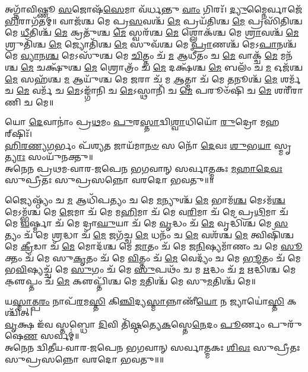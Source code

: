 {\small \closesection}

\newcommand{\cham}[3]{\refstepcounter{cj}%
#1\\
𑌅𑌨𑍇𑌨 #2-𑌵𑌾𑌰-𑌜𑌪𑍇𑌨 𑌭𑌗𑌵𑌾𑌨𑍍 𑌸𑌰𑍍𑌵𑌾𑌤𑍍𑌮𑌕𑌃 \underline{#3} 𑌸𑍁𑌪𑍍𑌰𑍀𑌤𑌃 𑌸𑍁𑌪𑍍𑌰𑌸𑌨𑍍𑌨𑍋 𑌵𑌰𑌦𑍋 𑌭𑌵𑌤𑍁॥\devanumber{\arabic{cj}}॥}

𑌅𑌗𑍍𑌨𑌾᳴𑌵𑌿𑌷𑍍𑌣𑍂 \ul{𑌸}\-𑌜𑍋𑌷᳴\-\ul{𑌸𑍇}\-𑌮𑌾 𑌵᳴𑌰𑍍𑌧𑌨𑍍𑌤𑍁 \ul{𑌵𑌾𑌂} 𑌗𑌿𑌰𑌃᳴। \ul{𑌦𑍍𑌯𑍁}\-𑌮𑍍𑌨𑍈𑌰𑍍𑌵𑌾𑌜𑍇᳴\-\ul{𑌭𑌿}\-𑌰𑌾\-𑌗᳴𑌤𑌮𑍍॥ 
𑌵𑌾𑌜᳴𑌶𑍍𑌚 𑌮𑍇 𑌪𑍍𑌰\-\ul{𑌸}\-𑌵𑌶𑍍𑌚᳴ \ul{𑌮𑍇} 𑌪𑍍𑌰𑌯᳴𑌤𑌿𑌶𑍍𑌚 \ul{𑌮𑍇} 𑌪𑍍𑌰𑌸𑌿᳴𑌤𑌿𑌶𑍍𑌚 𑌮𑍇 \ul{𑌧𑍀}\-𑌤𑌿𑌶𑍍𑌚᳴ \ul{𑌮𑍇} 𑌕𑍍𑌰𑌤𑍁᳴𑌶𑍍𑌚 \ul{𑌮𑍇} 𑌸𑍍𑌵𑌰᳴𑌶𑍍𑌚 \ul{𑌮𑍇} 𑌶𑍍𑌲𑍋𑌕᳴𑌶𑍍𑌚 𑌮𑍇 \ul{𑌶𑍍𑌰𑌾}\-𑌵𑌶𑍍𑌚᳴ \ul{𑌮𑍇} 𑌶𑍍𑌰𑍁𑌤𑌿᳴𑌶𑍍𑌚 \ul{𑌮𑍇} 𑌜𑍍𑌯𑍋𑌤𑌿᳴𑌶𑍍𑌚 \ul{𑌮𑍇} 𑌸𑍁𑌵᳴𑌶𑍍𑌚 𑌮𑍇 \ul{𑌪𑍍𑌰𑌾}\-𑌣𑌶𑍍𑌚᳴ 𑌮𑍇𑌽\-\ul{𑌪𑌾}\-𑌨𑌶𑍍𑌚᳴ 𑌮𑍇 \ul{𑌵𑍍𑌯𑌾}\-𑌨\-\ul{𑌶𑍍𑌚} 𑌮𑍇𑌽𑌸𑍁᳴𑌶𑍍𑌚 𑌮𑍇 \ul{𑌚𑌿}\-𑌤𑍍𑌤𑌂 𑌚᳴ \ul{𑌮} 𑌆𑌧𑍀᳴𑌤𑌂 𑌚 \ul{𑌮𑍇} 𑌵𑌾𑌕𑍍𑌚᳴ \ul{𑌮𑍇} 𑌮𑌨᳴𑌶𑍍𑌚 \ul{𑌮𑍇} 𑌚𑌕𑍍𑌷𑍁᳴𑌶𑍍𑌚 \ul{𑌮𑍇} 𑌶𑍍𑌰𑍋𑌤𑍍𑌰𑌂᳴ 𑌚 \ul{𑌮𑍇} 𑌦𑌕𑍍𑌷᳴𑌶𑍍𑌚 \ul{𑌮𑍇} 𑌬𑌲𑌂᳴ 𑌚 \ul{𑌮} 𑌓𑌜᳴𑌶𑍍𑌚 \ul{𑌮𑍇} 𑌸𑌹᳴𑌶𑍍𑌚 \ul{𑌮} 𑌆𑌯𑍁᳴𑌶𑍍𑌚 𑌮𑍇 \ul{𑌜}\-𑌰𑌾 𑌚᳴ 𑌮 \ul{𑌆}\-𑌤𑍍𑌮𑌾 𑌚᳴ 𑌮𑍇 \ul{𑌤}\-𑌨𑍂𑌶𑍍𑌚᳴ \ul{𑌮𑍇} 𑌶𑌰𑍍𑌮᳴ 𑌚 \ul{𑌮𑍇} 𑌵𑌰𑍍𑌮᳴ 𑌚 \ul{𑌮𑍇}\-𑌽𑌙𑍍𑌗𑌾᳴𑌨𑌿 𑌚 \ul{𑌮𑍇}\-𑌽𑌸𑍍𑌥𑌾𑌨𑌿᳴ 𑌚 \ul{𑌮𑍇} 𑌪𑌰𑍂𑍞᳴𑌷𑌿 𑌚 \ul{𑌮𑍇} 𑌶𑌰𑍀᳴𑌰𑌾𑌣𑌿 𑌚 𑌮𑍇॥

\cham{𑌯𑍋 \ul{𑌦𑍇}\-𑌵𑌾𑌨𑌾𑌂॑ 𑌪𑍍𑌰\-\ul{𑌥}\-𑌮𑌂 \ul{𑌪𑍁}\-𑌰\-\ul{𑌸𑍍𑌤𑌾}\-𑌦𑍍𑌵𑌿\-\ul{𑌶𑍍𑌵𑌾}\-𑌧𑌿𑌯𑍋᳴ \ul{𑌰𑍁}\-𑌦𑍍𑌰𑍋 𑌮𑌹𑌰𑍍‌𑌷𑌿𑌃᳴।\\
\-\ul{𑌹𑌿}\-\-\ul{𑌰}\-\-\ul{𑌣𑍍𑌯}\-\-\ul{𑌗}\-𑌰𑍍𑌭𑌂 𑌪᳴𑌶𑍍𑌯\-\ul{𑌤} 𑌜𑌾𑌯᳴𑌮𑌾\-\ul{𑌨}\-\-\ul{𑍞} 𑌸 𑌨𑍋᳴ \ul{𑌦𑍇}\-𑌵𑌃 \ul{𑌶𑍁}\-𑌭\-\ul{𑌯𑌾} 𑌸𑍍𑌮𑍃\-\ul{𑌤𑍍𑌯𑌾𑌃} 𑌸𑌂𑌯𑍁᳴𑌨𑌕𑍍𑌤𑍁॥}{𑌪𑍍𑌰𑌥𑌮}{𑌮𑌹𑌾𑌦𑍇𑌵𑌃}

𑌜𑍍𑌯𑍈𑌷𑍍𑌠𑍍𑌯𑌂᳴ 𑌚 \ul{𑌮} 𑌆𑌧𑌿᳴𑌪𑌤𑍍𑌯𑌂 𑌚 𑌮𑍇 \ul{𑌮}\-𑌨𑍍𑌯𑍁𑌶𑍍𑌚᳴ \ul{𑌮𑍇} 𑌭𑌾𑌮᳴\-\ul{𑌶𑍍𑌚} 𑌮𑍇𑌽𑌮᳴\-\ul{𑌶𑍍𑌚} 𑌮𑍇𑌽𑌮𑍍𑌭᳴𑌶𑍍𑌚 𑌮𑍇 \ul{𑌜𑍇}\-𑌮𑌾 𑌚᳴ 𑌮𑍇 𑌮\-\ul{𑌹𑌿}\-𑌮𑌾 𑌚᳴ 𑌮𑍇 𑌵\-\ul{𑌰𑌿}\-𑌮𑌾 𑌚᳴ 𑌮𑍇 𑌪𑍍𑌰\-\ul{𑌥𑌿}\-𑌮𑌾 𑌚᳴ 𑌮𑍇 \ul{𑌵}\-𑌰𑍍𑌷𑍍𑌮𑌾 𑌚᳴ 𑌮𑍇 𑌦𑍍𑌰𑌾\-\ul{𑌘𑍁}\-𑌯𑌾 𑌚᳴ 𑌮𑍇 \ul{𑌵𑍃}\-𑌦𑍍𑌧𑌂 𑌚᳴ \ul{𑌮𑍇} 𑌵𑍃𑌦𑍍𑌧𑌿᳴𑌶𑍍𑌚 𑌮𑍇 \ul{𑌸}\-𑌤𑍍𑌯𑌂 𑌚᳴ 𑌮𑍇 \ul{𑌶𑍍𑌰}\-𑌦𑍍𑌧𑌾 𑌚᳴ \ul{𑌮𑍇} 𑌜𑌗᳴𑌚𑍍𑌚 \ul{𑌮𑍇} 𑌧𑌨𑌂᳴ 𑌚 \ul{𑌮𑍇} 𑌵𑌶᳴𑌶𑍍𑌚 \ul{𑌮𑍇} 𑌤𑍍𑌵𑌿𑌷𑌿᳴𑌶𑍍𑌚 𑌮𑍇 \ul{𑌕𑍍𑌰𑍀}\-𑌡𑌾 𑌚᳴ \ul{𑌮𑍇} 𑌮𑍋𑌦᳴𑌶𑍍𑌚 𑌮𑍇 \ul{𑌜𑌾}\-𑌤𑌂 𑌚᳴ 𑌮𑍇 𑌜\-\ul{𑌨𑌿}\-𑌷𑍍𑌯𑌮𑌾᳴𑌣𑌂 𑌚 𑌮𑍇 \ul{𑌸𑍂}\-𑌕𑍍𑌤𑌂 𑌚᳴ 𑌮𑍇 𑌸𑍁\-\ul{𑌕𑍃}\-𑌤𑌂 𑌚᳴ 𑌮𑍇 \ul{𑌵𑌿}\-𑌤𑍍𑌤𑌂 𑌚᳴ \ul{𑌮𑍇} 𑌵𑍇𑌦𑍍𑌯𑌂᳴ 𑌚 𑌮𑍇 \ul{𑌭𑍂}\-𑌤𑌂 𑌚᳴ 𑌮𑍇 𑌭\-\ul{𑌵𑌿}\-𑌷𑍍𑌯𑌚𑍍𑌚᳴ 𑌮𑍇 \ul{𑌸𑍁}\-𑌗𑌂 𑌚᳴ 𑌮𑍇 \ul{𑌸𑍁}\-𑌪𑌥𑌂᳴ 𑌚 𑌮 \ul{𑌋}\-𑌦𑍍𑌧𑌂 𑌚᳴ \ul{𑌮} 𑌋𑌦𑍍𑌧𑌿᳴𑌶𑍍𑌚 𑌮𑍇 𑌕𑍢॒𑌪𑍍𑌤𑌂 𑌚᳴ \ul{𑌮𑍇} 𑌕𑍢𑌪𑍍𑌤𑌿᳴𑌶𑍍𑌚 𑌮𑍇 \ul{𑌮}\-𑌤𑌿𑌶𑍍𑌚᳴ 𑌮𑍇 𑌸𑍁\-\ul{𑌮}\-𑌤𑌿𑌶𑍍𑌚᳴ 𑌮𑍇॥

\cham{𑌯\-\ul{𑌸𑍍𑌮𑌾}\-𑌤𑍍𑌪\-\ul{𑌰𑌂} 𑌨𑌾𑌪᳴\-\ul{𑌰}\-𑌮\-\ul{𑌸𑍍𑌤𑌿} 𑌕𑌿\-\ul{𑌞𑍍𑌚𑌿}\-𑌦𑍍𑌯\-\ul{𑌸𑍍𑌮𑌾}\-𑌨𑍍𑌨𑌾𑌣𑍀᳴\-\ul{𑌯𑍋} 𑌨 𑌜𑍍𑌯𑌾𑌯𑍋॑\-\ul{𑌸𑍍𑌤𑌿} 𑌕𑌶𑍍𑌚𑌿᳴𑌤𑍍।\\
\-\ul{𑌵𑍃}\-𑌕𑍍𑌷 𑌇᳴𑌵 𑌸𑍍𑌤𑌬𑍍𑌧𑍋 \ul{𑌦𑌿}\-𑌵𑌿 𑌤𑌿᳴\-\ul{𑌷𑍍𑌠}\-𑌤𑍍𑌯𑍇\-\ul{𑌕}\-𑌸𑍍𑌤𑍇\-\ul{𑌨𑍇}\-𑌦𑌂 \ul{𑌪𑍂}\-𑌰𑍍𑌣𑌂 𑌪𑍁𑌰𑍁᳴𑌷𑍇\-\ul{𑌣} 𑌸𑌰𑍍𑌵𑌮𑍍॑॥}{𑌦𑍍𑌵𑌿𑌤𑍀𑌯}{𑌶𑌿𑌵𑌃}

